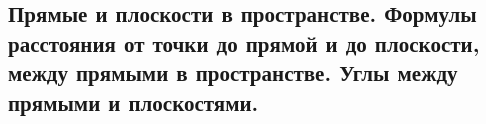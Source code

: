 \subsection{Прямые и плоскости в пространстве. Формулы расстояния от точки до прямой и до плоскости, между прямыми в пространстве. Углы между прямыми и плоскостями.}
